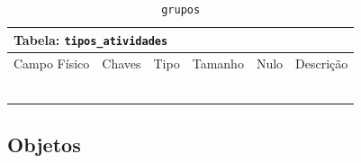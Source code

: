 \documentclass[12pt,a4paper]{article}
\begin{document}
\begin{center}
\begin{table}[h!]
	\caption{\texttt{grupos}}
	\label{tabela:grupos}
	\begin{tabular}{|p{2.5cm}|p{1cm}|p{1.25cm}|p{1.75cm}|p{1.25cm}|p{5cm}|}\hline	
		\multicolumn{6}{|p{16cm}|}{\cellcolor{cinzaClaro}  \centering Tabela: \texttt{tipos\_atividades}} \\ \hline %
		{\small Campo Físico}   & {\small Chaves} & {\small Tipo} & {\small Tamanho} & {\small Nulo} & {\small Descrição}\\\hline %
		
		{\tiny } & {\tiny } & {\tiny } & {\tiny } & {\tiny } &{\tiny }\\\hline
		{\tiny } & {\tiny } & {\tiny } & {\tiny } & {\tiny } &{\tiny }\\\hline
		{\tiny } & {\tiny } & {\tiny } & {\tiny } & {\tiny } &{\tiny }\\\hline
		{\tiny } & {\tiny } & {\tiny } & {\tiny } & {\tiny } &{\tiny }\\\hline
		{\tiny } & {\tiny } & {\tiny } & {\tiny } & {\tiny } &{\tiny }\\\hline
		{\tiny } & {\tiny } & {\tiny } & {\tiny } & {\tiny } &{\tiny }\\\hline
			
	\end{tabular}
\end{table}	
\end{center}



\subsection{Objetos}

\end{document}
